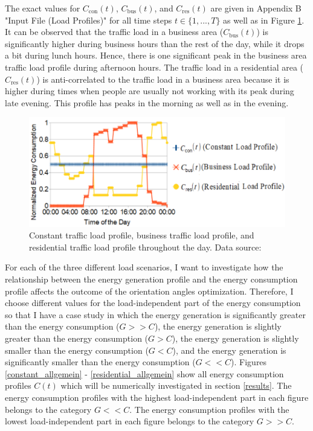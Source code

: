The exact values for $C_{\mathrm{con}}(t)$, $C_{\mathrm{bus}}(t)$, and $C_{\mathrm{res}}(t)$ are given in Appendix B "Input File (Load Profiles)" for all time steps $t\in\{1,...,T\}$ as well as in Figure \ref{all_consumption_profiles}.
It can be observed that the traffic load in a business area ($C_{\mathrm{bus}}(t)$) is significantly higher during business hours than the rest of the day, while it drops a bit during lunch hours. Hence, there is one significant peak in the business area traffic load profile during afternoon hours. The traffic load in a residential area ($C_{\mathrm{res}}(t)$) is anti-correlated to the traffic load in a business area because it is higher during times when people are usually not working with its peak during late evening. This profile has peaks in the morning as well as in the evening.




\begin{figure}[H]
	\centering
		\includegraphics[width=0.8\columnwidth]{pictures/all_consumption_profiles2}
\caption[Constant traffic load profile, business traffic load profile, and residential traffic load profile throughout the day]{Constant traffic load profile, business traffic load profile, and residential traffic load profile throughout the day. Data source: \cite{load}\label{all_consumption_profiles}}
\end{figure}

For each of the three different load scenarios, I want to investigate how the relationship between the energy generation profile and the energy consumption profile affects the outcome of the orientation angles optimization. Therefore, I choose different values for the load-independent part of the energy consumption so that I have a case study in which the energy generation is significantly greater than the energy consumption ($G>>C$), the energy generation is slightly greater than the energy consumption ($G>C$), the energy generation is slightly smaller than the energy consumption ($G<C$), and the energy generation is significantly smaller than the energy consumption ($G<<C$). Figures \ref{constant_allgemein} - \ref{residential_allgemein} show all energy consumption profiles $C(t)$ which will be numerically investigated in section \ref{results}. The energy consumption profiles with the highest load-independent part in each figure belongs to the category $G<<C$. The energy consumption profiles with the lowest load-independent part in each figure belongs to the category $G>>C$.



